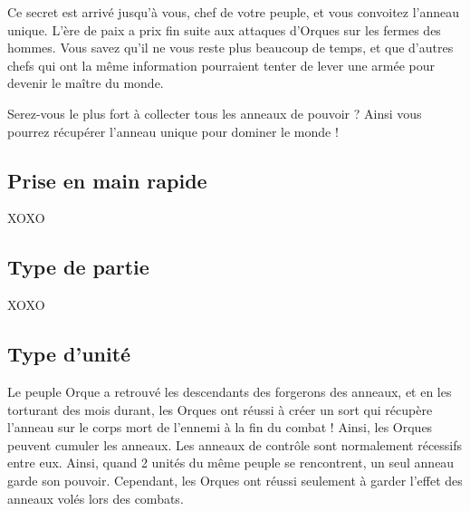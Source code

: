 Ce secret est arrivé jusqu'à vous, chef de votre peuple, et vous convoitez l'anneau unique. L'ère de paix a prix fin suite aux attaques d'Orques sur les fermes des hommes.  Vous savez qu'il ne vous reste plus beaucoup de temps, et que d'autres chefs qui ont la même information pourraient tenter de lever une armée pour devenir le maître du monde.

Serez-vous le plus fort à collecter tous les anneaux de pouvoir ? Ainsi vous pourrez récupérer l'anneau unique pour dominer le monde !

\subsection{Prise en main rapide}

XOXO

\subsection{Type de partie}

XOXO

\subsection{Type d'unité}

Le peuple Orque a retrouvé les descendants des forgerons des anneaux, et en les torturant des mois durant, les Orques ont réussi à créer un sort qui récupère l'anneau sur le corps mort de l'ennemi à la fin du combat ! Ainsi, les Orques peuvent cumuler les anneaux.
Les anneaux de contrôle sont normalement récessifs entre eux. Ainsi, quand 2 unités du même peuple se rencontrent, un seul anneau garde son pouvoir. Cependant, les Orques ont réussi seulement à garder l'effet des anneaux volés lors des combats.